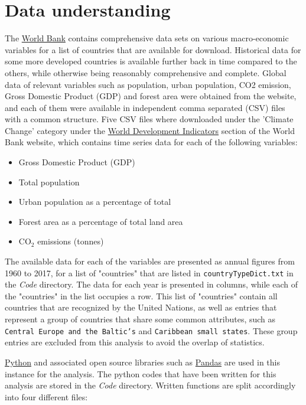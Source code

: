 \documentclass[11pt,a4paper,titlepage]{article}
\newcommand{\blankline}{\quad\pagebreak[2]}
\begin{document}
\section{Data understanding}

\blankline

The \href{https://www.worldbank.org/}{World Bank} contains comprehensive data sets on various macro-economic variables for a list of countries that are available for download. Historical data for some more developed countries is available further back in time compared to the others, while otherwise being reasonably comprehensive and complete. Global data of relevant variables such as population, urban population, CO2 emission, Gross Domestic Product (GDP) and forest area were obtained from the website, and each of them were available in independent comma separated (CSV) files with a common structure. Five CSV files where downloaded under the 'Climate Change' category under the \href{https://data.worldbank.org/indicator}{World Development Indicators} section of the World Bank website, which contains time series data for each of the following variables:

\begin{itemize}
    \item{Gross Domestic Product (GDP)}
    \item{Total population}
    \item{Urban population as a percentage of total}
    \item{Forest area as a percentage of total land area}
    \item{CO$_2$ emissions (tonnes)}
\end{itemize}

The available data for each of the variables are presented as annual figures from 1960 to 2017, for a list of "countries" that are listed in \texttt{countryTypeDict.txt} in the \textit{Code} directory. The data for each year is presented in columns, while each of the "countries" in the list occupies a row. This list of "countries" contain all countries that are recognized by the United Nations, as well as entries that represent a group of countries that share some common attributes, such as \texttt{Central Europe and the Baltic's} and \texttt{Caribbean small states}. These group entries are excluded from this analysis to avoid the overlap of statistics.

\blankline

\href{https://www.python.org/}{Python} and associated open source libraries such as \href{https://pandas.pydata.org/}{Pandas} are used in this instance for the analysis. The python codes that have been written for this analysis are stored in the \textit{Code} directory. Written functions are split accordingly into four different files:
\end{document}

